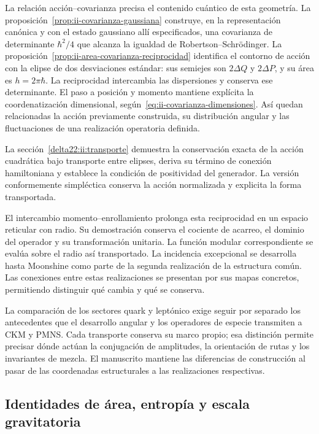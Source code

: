 La relación acción--covarianza precisa el contenido cuántico de esta
geometría. La proposición~\ref{prop:ii-covarianza-gaussiana} construye,
en la representación canónica y con el estado gaussiano allí especificados,
una covarianza de determinante \(\hbar^2/4\) que alcanza la igualdad de
Robertson--Schrödinger. La proposición~\ref{prop:ii-area-covarianza-reciprocidad}
identifica el contorno de acción con la elipse de dos desviaciones
estándar: sus semiejes son \(2\Delta Q\) y \(2\Delta P\), y su área
es \(h=2\pi\hbar\). La reciprocidad intercambia las dispersiones y
conserva ese determinante. El paso a posición y momento mantiene explícita
la coordenatización dimensional, según~\eqref{eq:ii-covarianza-dimensiones}.
Así quedan relacionadas la acción previamente construida, su distribución
angular y las fluctuaciones de una realización operatoria definida.

La sección~\ref{delta22:ii:transporte} demuestra la conservación
exacta de la acción cuadrática bajo transporte entre elipses, deriva
su término de conexión hamiltoniana y establece la condición de
positividad del generador. La versión conformemente simpléctica
conserva la acción normalizada y explicita la forma transportada.


El intercambio momento--enrollamiento prolonga esta reciprocidad en
un espacio reticular con radio. Su demostración conserva el cociente
de acarreo, el dominio del operador y su transformación unitaria.
La función modular correspondiente se evalúa sobre el radio así
transportado. La incidencia excepcional se desarrolla hasta Moonshine
como parte de la segunda realización de la estructura común. Las
conexiones entre estas realizaciones se presentan por sus mapas
concretos, permitiendo distinguir qué cambia y qué se conserva.

La comparación de los sectores quark y leptónico exige seguir por separado
los antecedentes que el desarrollo angular y los operadores de especie
transmiten a CKM y PMNS. Cada transporte conserva su marco propio; esa
distinción permite precisar dónde actúan la conjugación de amplitudes,
la orientación de rutas y los invariantes de mezcla. El manuscrito
mantiene las diferencias de construcción al pasar de las coordenadas
estructurales a las realizaciones respectivas.

\subsection{Identidades de área, entropía y escala gravitatoria}

